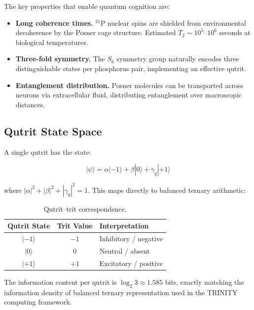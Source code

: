 \documentclass[12pt,a4paper]{article}
\begin{document}
The key properties that enable quantum cognition are:

\begin{itemize}[leftmargin=2em]
  \item \textbf{Long coherence times.} ${}^{31}\mathrm{P}$ nuclear spins are
    shielded from environmental decoherence by the Posner cage structure.
    Estimated $T_2 \sim 10^5$--$10^6$ seconds at biological temperatures.
  \item \textbf{Three-fold symmetry.} The $S_6$ symmetry group naturally
    encodes three distinguishable states per phosphorus pair, implementing
    an effective qutrit.
  \item \textbf{Entanglement distribution.} Posner molecules can be
    transported across neurons via extracellular fluid, distributing
    entanglement over macroscopic distances.
\end{itemize}

\subsection{Qutrit State Space}

A single qutrit has the state:

\begin{equation}
|\psi\rangle = \alpha|{-1}\rangle + \beta|{0}\rangle + \gamma_q|{+1}\rangle
\label{eq:qutrit}
\end{equation}

\noindent
where $|\alpha|^2 + |\beta|^2 + |\gamma_q|^2 = 1$. This maps directly to
balanced ternary arithmetic:

\begin{table}[h!]
\centering
\caption{Qutrit--trit correspondence.}
\label{tab:qutrit_trit}
\begin{tabular}{@{}ccl@{}}
\toprule
\textbf{Qutrit State} & \textbf{Trit Value} & \textbf{Interpretation} \\
\midrule
$|{-1}\rangle$ & $-1$ & Inhibitory / negative \\
$|0\rangle$ & $0$ & Neutral / absent \\
$|{+1}\rangle$ & $+1$ & Excitatory / positive \\
\bottomrule
\end{tabular}
\end{table}

The information content per qutrit is $\log_2 3 \approx 1.585$ bits, exactly
matching the information density of balanced ternary representation used in
the TRINITY computing framework.
\end{document}
